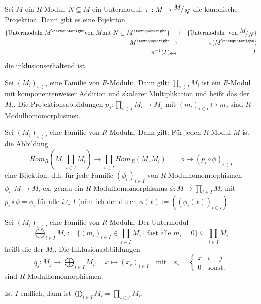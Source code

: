 \begin{sa}\label{1.14}
	Sei $M$ ein $R$-Modul, $N \subseteq M$ ein Untermodul, $ \pi: M \to \QR{M}{N} $ die kanonische Projektion. Dann gibt es eine Bijektion 
	\begin{eqnarray*}
		\{\text{Untermoduln} \ M^{’} \text{von} \  M \text{mit} \ N \subseteq M^{’} \} &\longrightarrow &\{\text{Untermoduln } \text{ von } \QR{M}{N}\}\\
		M^{’}& \mapsto & \pi(M^{’}) \\
		\pi^{-1}(L) &\rotatebox[]{180}{$\mapsto$} & L %
	\end{eqnarray*}
	die inklusionserhaltend ist.
\end{sa}
\begin{bem+df}\label{1.15}
	Sei $(M_i)_{i \in I}$ eine Familie von $R$-Moduln. Dann gilt: $\prod_{i \in I} M_i$ ist ein $R$-Modul mit komponentenweiser Addition und skalarer Multiplikation und heißt das  der $M_{i}$. Die Projektionsabbildungen $p_{j}: \prod_{i \in I} M_i \to M_{j} $ mit $(m_i)_{i \in I} \mapsto m_j $ sind $R$-Modulhomomorphismen.
\end{bem+df}
\begin{sa}\label{sa1.16} Sei $(M_i)_{i \in I}$ eine Familie von $R$-Moduln. Dann gilt: Für jeden $R$-Modul $M$ ist die Abbildung $$ Hom_{R}(M,\prod_{i \in I} M_i) \to \prod_{i \in I} Hom_{R}(M,M_i) \qquad \phi \mapsto (p_i \circ \phi)_{i \in I}$$
	eine Bijektion, d.h. für jede Familie $(\phi_i)_{i \in I}$ von $R$-Modulhomomorphismen $\phi_i: M \to M_i $ ex. genau ein $R$-Modulhomomorphismus $\phi: M \to \prod_{i \in I} M_i$ mit $ p_i \circ \phi = \phi_i$ für alle $i \in I$ (nämlich der durch $\phi(x) := ((\phi_i(x))_{i\in I}) $
\end{sa}
\begin{df}\label{1.17}
	Sei $(M_i)_{i \in I}$ eine Familie von $R$-Moduln. Der Untermodul $$ \bigoplus_{i \in I} M_i := \{(m_i)_{i \in I} \in \prod_{i \in I} M_i \ | \text{ fast alle }  m_i =0\} \subseteq \prod_{i \in I} M_i $$ 
	heißt die  der $M_i$. Die Inklusionsabbildungen $$q_j: M_j \to \bigoplus_{i \in I} M_i, \quad x \mapsto (x_i)_{i \in I} \quad \text{mit} \quad x_i=\begin{cases} x & i = j \\ 0 & \text{sonst.} \end{cases}$$ sind $R$-Modulhomomorphismen.
\end{df}
\begin{anm}
	Ist $I$ endlich, dann ist $\bigoplus_{i \in I}M_i = \prod_{i \in I} M_i$.
\end{anm}
